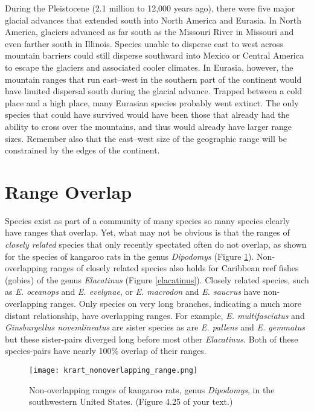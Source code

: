 \documentclass[11pt, hidelinks]{article}
\begin{document}
During the Pleistocene (2.1 million to 12,000 years ago), there were five major glacial advances that extended south into North America and Eurasia. In North America, glaciers advanced as far south as the Missouri River in Missouri and even farther south in Illinois.  Species unable to disperse east to west across mountain barriers could still disperse southward into Mexico or Central America to escape the glaciers and associated cooler climates.  In Eurasia, however, the mountain ranges that run east--west in the southern part of the continent would have limited dispersal south during the glacial advance.  Trapped between a cold place and a high place, many Eurasian species probably went extinct.  The only species that could have survived would have been those that already had the ability to cross over the mountains, and thus would already have larger range sizes. Remember also that the east--west size of the geographic range will be constrained by the edges of the continent.

\section{Range Overlap}

Species exist as part of a community of many species so many species clearly have ranges that overlap. Yet, what may not be obvious is that the ranges of \emph{closely related} species that only recently spectated often do not overlap, as shown for the species of kangaroo rats in the genus \emph{Dipodomys} (Figure \ref{krat range}).  Non-overlapping ranges of closely related species also holds for Caribbean reef fishes (gobies) of the genus \emph{Elacatinus} (Figure \ref{elacatinus}). Closely related species, such as \emph{E. oceanops} and \emph{E. evelynae}, or \emph{E. macrodon} and \emph{E. saucrus} have non-overlapping ranges.  Only species on very long branches, indicating a much more distant relationship, have overlapping ranges.  For example, \emph{E. multifasciatus} and \emph{Ginsburgellus novemlineatus} are sister species as are \emph{E. pallens} and \emph{E. gemmatus} but these sister-pairs diverged long before most other \emph{Elacatinus}. Both of these species-pairs have nearly 100\% overlap of their ranges.

\begin{figure}[tb]
	\centering
		\texttt{[image: krart\_nonoverlapping\_range.png]}  
		\caption{Non-overlapping ranges of kangaroo rats, genus \emph{Dipodomys}, in the southwestern United States. (Figure 4.25 of your text.)\label{krat range}}
\end{figure}
\end{document}
